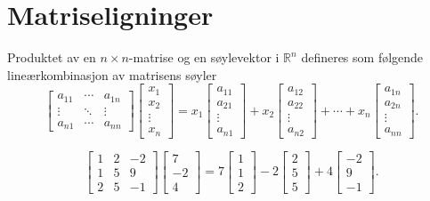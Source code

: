 \section*{Matriseligninger}
Produktet av en $n\times n$-matrise og en søylevektor i $\mathbb{R}^n$ defineres som følgende lineærkombinasjon av matrisens søyler
\begin{equation*}
\begin{bmatrix}
a_{11}    &  \cdots & a_{1n}   \\
\vdots  & \ddots & \vdots\\
a_{n1}  & \cdots &  a_{nn}  
\end{bmatrix}
\begin{bmatrix}
x_1   \\
x_2 \\
\vdots \\
x_n 
\end{bmatrix}=
x_1
\begin{bmatrix}
a_{11}     \\
a_{21}   \\
\vdots \\
a_{n1}   
\end{bmatrix}
+
x_2
\begin{bmatrix}
a_{12}    \\
a_{22}    \\
\vdots \\
a_{n2}    
\end{bmatrix}
+
\cdots
+
x_n
\begin{bmatrix}
a_{1n}   \\
a_{2n}  \\
\vdots \\
a_{nn}  
\end{bmatrix}.
\end{equation*}
\begin{ex}
	\begin{equation*}
	\begin{bmatrix}
	1  &  2  &  -2   \\
	1  & 5  &  9  \\
	2  & 5  &  -1  
	\end{bmatrix}
	\begin{bmatrix}
	7   \\
	-2 \\
	4 
	\end{bmatrix}=
	7
	\begin{bmatrix}
	1     \\
	1   \\
	2   
	\end{bmatrix}
	-
	2
	\begin{bmatrix}
	2   \\
	5   \\
	5    
	\end{bmatrix}
	+
	4
	\begin{bmatrix}
	-2   \\
	9 \\
	-1 
	\end{bmatrix}.
	\end{equation*}
\end{ex}
